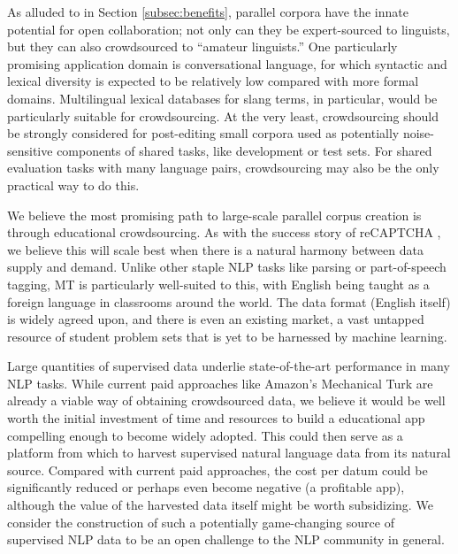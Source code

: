 As alluded to in Section \ref{subsec:benefits}, parallel corpora have the innate potential for open collaboration; not only can they be expert-sourced to linguists, but they can also crowdsourced to ``amateur linguists.''
One particularly promising application domain is conversational language, for which syntactic and lexical diversity is expected to be relatively low compared with more formal domains. 
Multilingual lexical databases for slang terms, in particular, would be particularly suitable for crowdsourcing.
At the very least, crowdsourcing should be strongly considered for post-editing small corpora used as potentially noise-sensitive components of shared tasks, like development or test sets.
For shared evaluation tasks with many language pairs, crowdsourcing may also be the only practical way to do this.

We believe the most promising path to large-scale parallel corpus creation is through educational crowdsourcing.
As with the success story of reCAPTCHA , we believe this will scale best when there is a natural harmony between data supply and demand.
Unlike other staple NLP tasks like parsing or part-of-speech tagging, MT is particularly well-suited to this, with English being taught as a foreign language in classrooms around the world.
The data format (English itself) is widely agreed upon, and there is even an existing market, a vast untapped resource of student problem sets that is yet to be harnessed by machine learning.

Large quantities of supervised data underlie state-of-the-art performance in many NLP tasks.
While current paid approaches like Amazon's Mechanical Turk are already a viable way of obtaining crowdsourced data, we believe it would be well worth the initial investment of time and resources to build a educational app compelling enough to become widely adopted.
This could then serve as a platform from which to harvest supervised natural language data from its natural source. 
Compared with current paid approaches, the cost per datum could be significantly reduced or perhaps even become negative (a profitable app), although the value of the harvested data itself might be worth subsidizing.
We consider the construction of such a potentially game-changing source of supervised NLP data to be an open challenge to the NLP community in general.


